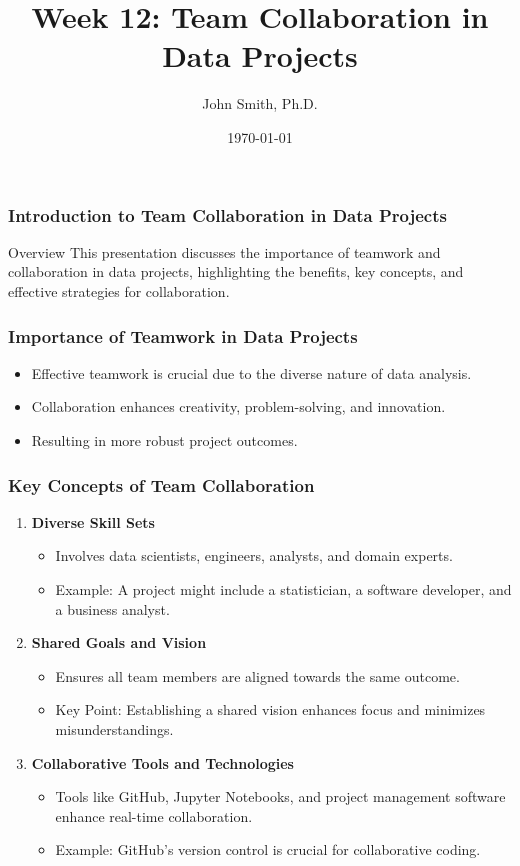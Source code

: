 \documentclass[aspectratio=169]{beamer}
\title[Week 12: Team Collaboration in Data Projects]{Week 12: Team Collaboration in Data Projects}
\author[J. Smith]{John Smith, Ph.D.}
\institute[University Name]{
  Department of Computer Science\\
  University Name\\
  \vspace{0.3cm}
  Email: email@university.edu\\
  Website: www.university.edu
}
\date{\today}
\begin{document}
\frame{\titlepage}

\begin{frame}[fragile]
  \frametitle{Introduction to Team Collaboration in Data Projects}
  \begin{block}{Overview}
    This presentation discusses the importance of teamwork and collaboration in data projects, highlighting the benefits, key concepts, and effective strategies for collaboration.
  \end{block}
\end{frame}

\begin{frame}[fragile]
  \frametitle{Importance of Teamwork in Data Projects}
  \begin{itemize}
    \item Effective teamwork is crucial due to the diverse nature of data analysis.
    \item Collaboration enhances creativity, problem-solving, and innovation.
    \item Resulting in more robust project outcomes.
  \end{itemize}
\end{frame}

\begin{frame}[fragile]
  \frametitle{Key Concepts of Team Collaboration}
  \begin{enumerate}
    \item \textbf{Diverse Skill Sets}
      \begin{itemize}
        \item Involves data scientists, engineers, analysts, and domain experts.
        \item Example: A project might include a statistician, a software developer, and a business analyst.
      \end{itemize}
  
    \item \textbf{Shared Goals and Vision}
      \begin{itemize}
        \item Ensures all team members are aligned towards the same outcome.
        \item Key Point: Establishing a shared vision enhances focus and minimizes misunderstandings.
      \end{itemize}
  
    \item \textbf{Collaborative Tools and Technologies}
      \begin{itemize}
        \item Tools like GitHub, Jupyter Notebooks, and project management software enhance real-time collaboration.
        \item Example: GitHub's version control is crucial for collaborative coding.
      \end{itemize}
  \end{enumerate}
\end{frame}
\end{document}
